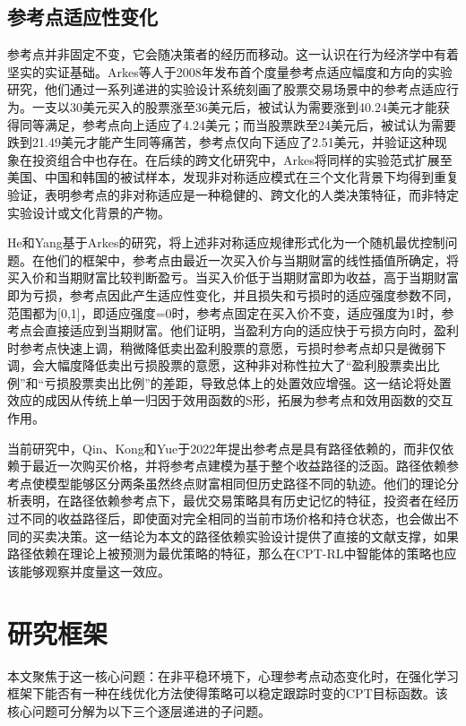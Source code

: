 \documentclass{sufethesismas}
\begin{document}
\subsection{参考点适应性变化}
参考点并非固定不变，它会随决策者的经历而移动。这一认识在行为经济学中有着坚实的实证基础。Arkes等人于2008年发布首个度量参考点适应幅度和方向的实验研究，他们通过一系列递进的实验设计系统刻画了股票交易场景中的参考点适应行为\citep{arkes2008reference}。一支以30美元买入的股票涨至36美元后，被试认为需要涨到40.24美元才能获得同等满足，参考点向上适应了4.24美元；而当股票跌至24美元后，被试认为需要跌到21.49美元才能产生同等痛苦，参考点仅向下适应了2.51美元，并验证这种现象在投资组合中也存在。在后续的跨文化研究中，Arkes将同样的实验范式扩展至美国、中国和韩国的被试样本，发现非对称适应模式在三个文化背景下均得到重复验证，表明参考点的非对称适应是一种稳健的、跨文化的人类决策特征，而非特定实验设计或文化背景的产物\citep{ARKES201099}。

He和Yang基于Arkes的研究，将上述非对称适应规律形式化为一个随机最优控制问题\citep{he2019realization}。在他们的框架中，参考点由最近一次买入价与当期财富的线性插值所确定，将买入价和当期财富比较判断盈亏。当买入价低于当期财富即为收益，高于当期财富即为亏损，参考点因此产生适应性变化，并且损失和亏损时的适应强度参数不同，范围都为[0,1]，即适应强度=0时，参考点固定在买入价不变，适应强度为1时，参考点会直接适应到当期财富。他们证明，当盈利方向的适应快于亏损方向时，盈利时参考点快速上调，稍微降低卖出盈利股票的意愿，亏损时参考点却只是微弱下调，会大幅度降低卖出亏损股票的意愿，这种非对称性拉大了“盈利股票卖出比例”和“亏损股票卖出比例”的差距，导致总体上的处置效应增强。这一结论将处置效应的成因从传统上单一归因于效用函数的S形，拓展为参考点和效用函数的交互作用。

当前研究中，Qin、Kong和Yue于2022年提出参考点是具有路径依赖的，而非仅依赖于最近一次购买价格，并将参考点建模为基于整个收益路径的泛函\citep{qin2022realization}。路径依赖参考点使模型能够区分两条虽然终点财富相同但历史路径不同的轨迹。他们的理论分析表明，在路径依赖参考点下，最优交易策略具有历史记忆的特征，投资者在经历过不同的收益路径后，即使面对完全相同的当前市场价格和持仓状态，也会做出不同的买卖决策。这一结论为本文的路径依赖实验设计提供了直接的文献支撑，如果路径依赖在理论上被预测为最优策略的特征，那么在CPT-RL中智能体的策略也应该能够观察并度量这一效应。

\section{研究框架}
本文聚焦于这一核心问题：在非平稳环境下，心理参考点动态变化时，在强化学习框架下能否有一种在线优化方法使得策略可以稳定跟踪时变的CPT目标函数。该核心问题可分解为以下三个逐层递进的子问题。
\end{document}
